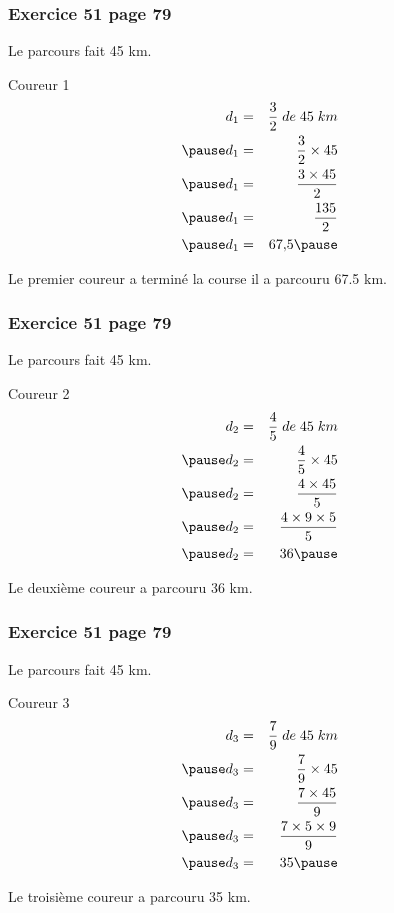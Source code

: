 \documentclass[xcolor={dvipsnames}]{beamer}
\begin{document}
\begin{frame}
	\frametitle{Exercice 51 page 79}
	Le parcours fait 45 km.
	
	\begin{block}{Coureur 1}
		\begin{eqnarray*}
			d_1 &=& \frac{3}{2} \; de \; 45 \; km \\ \pause
			d_1 &=& \frac{3}{2} \times 45 \\ \pause
			d_1 &=& \frac{3 \times 45}{2} \\ \pause
			d_1 &=& \frac{135}{2} \\ \pause
			d_1 &=& \num{67.5}  \pause
		\end{eqnarray*}
	
	Le premier coureur a terminé la course il a parcouru \num{67.5} km.
	\end{block}
\end{frame}

\begin{frame}
	\frametitle{Exercice 51 page 79}
	Le parcours fait 45 km.
	
	\begin{block}{Coureur 2}
		\begin{eqnarray*}
			d_2 &=& \frac{4}{5} \; de \; 45 \; km \\ \pause
			d_2 &=& \frac{4}{5} \times 45 \\ \pause
			d_2 &=& \frac{4 \times 45}{5} \\ \pause
			d_2 &=& \frac{4 \times 9 \times 5}{5} \\ \pause
			d_2 &=& \num{36}  \pause
		\end{eqnarray*}
		
		Le deuxième coureur a parcouru \num{36} km.
	\end{block}
\end{frame}


\begin{frame}
	\frametitle{Exercice 51 page 79}
	Le parcours fait 45 km.
	
	\begin{block}{Coureur 3}
		\begin{eqnarray*}
			d_3 &=& \frac{7}{9} \; de \; 45 \; km \\ \pause
			d_3 &=& \frac{7}{9} \times 45 \\ \pause
			d_3 &=& \frac{7 \times 45}{9} \\ \pause
			d_3 &=& \frac{7 \times 5 \times 9}{9} \\ \pause
			d_3 &=& \num{35}  \pause
		\end{eqnarray*}
		
		Le troisième coureur a parcouru \num{35} km.
	\end{block}
\end{frame}
\end{document}
